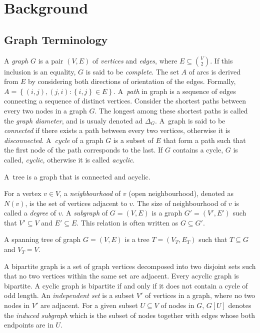 \chapter{Background}\label{sec:back}

\section{Graph Terminology}\label{sec:back:graph}

A \emph{graph} $G$ is a pair $(V,E)$ of \emph{vertices} and \emph{edges}, where $E\subseteq {{V}\choose{2}}$.
If this inclusion is an equality, $G$ is said to be \emph{complete}.
 The set $A$ of arcs is derived from $E$ by considering both directions of orientation of the edges.
 Formally, $A=\left\{(i,j),(j,i):\left\{i,j\right\}\in E\right\}$.
A~\emph{path} in graph is a sequence of edges connecting a sequence of distinct vertices.
Consider the shortest paths between every two nodes in a graph $G$.
The longest among these shortest paths is called the \emph{graph diameter}, and is usualy denoted ad $\Delta_G$.
A~graph is said to be \emph{connected} if there exists a path between every two vertices, otherwise it is \emph{disconnected}.
A~\emph{cycle} of a graph $G$ is a subset of $E$ that form a path such that the first node of the path corresponds to the last. 
If $G$ contains a cycle, $G$ is called, \emph{cyclic}, otherwise it is called \emph{acyclic}.
\begin{definition}
A~tree is a graph that is connected and acyclic.
\end{definition}
For a vertex $v\in V$, a \emph{neighbourhood} of $v$ (open neighbourhood), denoted as $N(v)$, is the set of vertices adjacent to $v$.
The size of neighbourhood of $v$ is called a \emph{degree} of $v$.
A \emph{subgraph} of $G=(V,E)$ is a graph $G'=(V',E')$ such that $V'\subseteq V$ and $E'\subseteq E$.
This relation is often written as $G\subseteq G'$.
\begin{definition}
A spanning tree of graph $G=(V,E)$ is a tree $T=(V_T,E_T)$ such that $T\subseteq G$ and $V_T=V$.
\end{definition}
A bipartite graph is a set of graph vertices decomposed into two disjoint sets such that no two vertices within the same set are adjacent.
Every acyclic graph is bipartite.
A cyclic graph is bipartite if and only if it does not contain a cycle of odd length.
An \emph{independent set} is a subset $V'$ of vertices in a graph, where no two nodes in $V'$ are adjacent.
For a given subset $U\subseteq V$ of nodes in $G$, $G\left[U\right]$ denotes the \emph{induced subgraph} which is the subset of nodes together with edges whose both endpoints are in $U$. 


